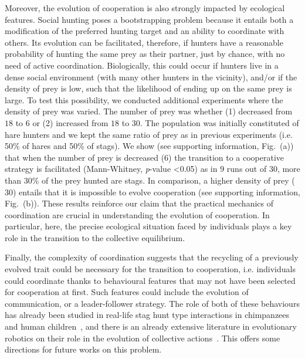     Moreover, the evolution of cooperation is also strongly impacted by ecological features. Social hunting poses a bootstrapping problem because it entails both a modification of the preferred hunting target and an ability to coordinate with others. Its evolution can be facilitated, therefore, if hunters have a reasonable probability of hunting the same prey as their partner, just by chance, with no need of active coordination. Biologically, this could occur if hunters live in a dense social environment (with many other hunters in the vicinity), and/or if the density of prey is low, such that the likelihood of ending up on the same prey is large. To test this possibility, we conducted additional experiments where the density of prey was varied. The number of prey was whether (1) decreased from $18$ to $6$ or (2) increased from $18$ to $30$. The population was initially constituted of hare hunters and we kept the same ratio of prey as in previous experiments (i.e. 50\% of hares and 50\% of stags). We show (see supporting information, Fig.~(a)) that when the number of prey is decreased ($6$) the transition to a cooperative strategy is facilitated (Mann-Whitney, {\em p}-value \textless 0.05) as in $9$ runs out of $30$, more than $30$\% of the prey hunted are stags. In comparison, a higher density of prey ($30$) entails that it is impossible to evolve cooperation (see supporting information, Fig.~(b)). These results reinforce our claim that the practical mechanics of coordination are crucial in understanding the evolution of cooperation. In particular, here, the precise ecological situation faced by individuals plays a key role in the transition to the collective equilibrium.

    Finally, the complexity of coordination suggests that the recycling of a previously evolved trait could be necessary for the transition to cooperation, i.e. individuals could coordinate thanks to behavioural features that may not have been selected for cooperation at first. Such features could include the evolution of communication, or a leader-follower strategy. The role of both of these behaviours has already been studied in real-life stag hunt type interactions in chimpanzees and human children~\parencite{Bullinger2011, Duguid2014}, and there is an already extensive literature in evolutionary robotics on their role in the evolution of collective actions~\parencite{Trianni2007, Mitri2009, Solomon2012, Ferrante2015}. This offers some directions for future works on this problem.


